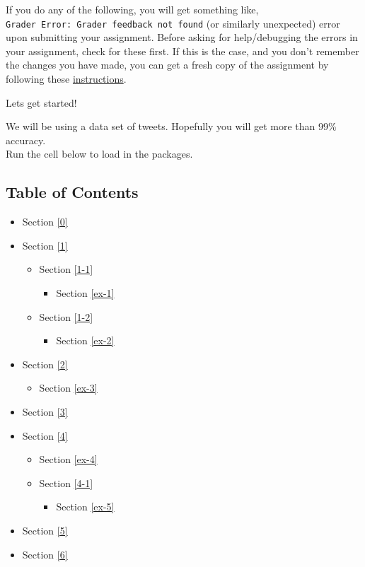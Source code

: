 \documentclass[11pt]{article}
\providecommand{\tightlist}{%
      \setlength{\itemsep}{0pt}\setlength{\parskip}{0pt}}
\begin{document}
If you do any of the following, you will get something like,
\texttt{Grader\ Error:\ Grader\ feedback\ not\ found} (or similarly
unexpected) error upon submitting your assignment. Before asking for
help/debugging the errors in your assignment, check for these first. If
this is the case, and you don't remember the changes you have made, you
can get a fresh copy of the assignment by following these
\href{https://www.coursera.org/learn/classification-vector-spaces-in-nlp/supplement/YLuAg/h-ow-to-refresh-your-workspace}{instructions}.

Lets get started!

We will be using a data set of tweets. Hopefully you will get more than
99\% accuracy.\\
Run the cell below to load in the packages.

    \hypertarget{table-of-contents}{%
\subsection{Table of Contents}\label{table-of-contents}}

\begin{itemize}
\tightlist
\item
  Section \ref{0}
\item
  Section \ref{1}

  \begin{itemize}
  \tightlist
  \item
    Section \ref{1-1}

    \begin{itemize}
    \tightlist
    \item
      Section \ref{ex-1}
    \end{itemize}
  \item
    Section \ref{1-2}

    \begin{itemize}
    \tightlist
    \item
      Section \ref{ex-2}
    \end{itemize}
  \end{itemize}
\item
  Section \ref{2}

  \begin{itemize}
  \tightlist
  \item
    Section \ref{ex-3}
  \end{itemize}
\item
  Section \ref{3}
\item
  Section \ref{4}

  \begin{itemize}
  \tightlist
  \item
    Section \ref{ex-4}
  \item
    Section \ref{4-1}

    \begin{itemize}
    \tightlist
    \item
      Section \ref{ex-5}
    \end{itemize}
  \end{itemize}
\item
  Section \ref{5}
\item
  Section \ref{6}
\end{itemize}
\end{document}

